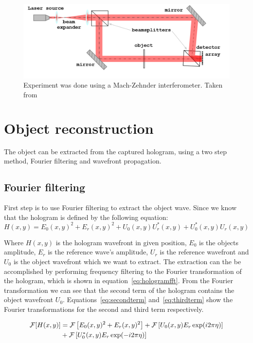 \documentclass[12pt,a4paper,english
]{tunithesis}
\begin{document}
\begin{figure}
  \centering
  \includegraphics[width=\columnwidth]{img/lab_setup.png}
  \caption{Experiment was done using a Mach-Zehnder interferometer. Taken from~\cite{assignment}}
  \label{fig:lab_setup}
\end{figure}


\section{Object reconstruction}
The object can be extracted from the captured hologram, using a two step method, Fourier filtering and wavefront propagation.

\subsection{Fourier filtering}
First step is to use Fourier filtering to extract the object wave. Since we know that the hologram is defined by the following equation:
\begin{equation}
H(x, y) = E_0(x, y)^2 + E_r(x, y)^2 + U_0(x, y)U_r^*(x, y) + U_0^*(x, y)U_r(x, y)
\label{eq:hologram}
\end{equation}

Where $H(x,y)$ is the hologram wavefront in given position, $E_0$ is the objects amplitude, $E_r$ is the reference wave's amplitude, $U_r$ is the reference wavefront and $U_0$ is the object wavefront which we want to extract. The extraction can the be accomplished by performing frequency filtering to the Fourier transformation of the hologram, which is shown in equation~\ref{eq:hologramfft}. From the Fourier transformation we can see that the second term of the hologram contains the object wavefront $U_0$. Equations~\ref{eq:secondterm} and~\ref{eq:thirdterm} show the Fourier transformations for the second and third term respectively.

\begin{align}
\mathcal{F}[H(x, y)] &= \mathcal{F}\left[E_0(x, y)^2 + E_r(x, y)^2\right] + \mathcal{F}\left[U_0(x, y)E_r \exp(i2\pi\eta)\right] \notag \\
& + \mathcal{F}\left[U_0^*(x, y)E_r \exp(-i2\pi\eta)\right]
\label{eq:hologramfft}
\end{align}
\end{document}
